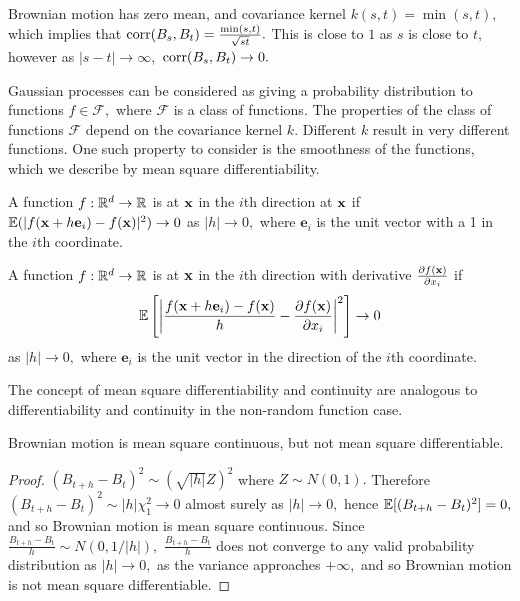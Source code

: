 Brownian motion has zero mean, and covariance kernel $k(s, t) = \min(s, t),$ which
implies that $\operatorname{corr}(B_s, B_t) = \frac{\min(s, t)}{\sqrt{st}}.$ This is close to
$1$ as $s$ is close to $t,$ however as $|s-t|\to\infty,$
$\operatorname{corr}(B_s, B_t) \to 0.$

Gaussian processes can be considered as giving a probability distribution to
functions $f\in\mathcal{F},$ where $\mathcal{F}$ is a class of functions.
The properties of the class of functions
$\mathcal{F}$ depend on the covariance kernel $k.$ Different $k$ result
in very different functions. One such property to consider is the smoothness of
the functions, which we describe by mean square differentiability.

\begin{definition}\label{def:MSC}
    A function $f:\mathbb{R}^d\to\mathbb{R}$ is  at $\mathbf{x}$
    in the $i$th direction at $\mathbf{x}$ if
    $\operatorname{\mathbb{E}}(|f(\mathbf{x} + h\mathbf{e}_i) - f(\mathbf{x})|^2)\to 0$ as $|h|\to 0,$
    where $\mathbf{e}_i$ is the unit vector with a 1 in the $i$th coordinate.
\end{definition}

\begin{definition}
    A function $f:\mathbb{R}^d\to\mathbb{R}$ is  at
    $\mathbf{x}$ in the $i$th direction with derivative
    $\frac{\partial f(\mathbf{x})}{\partial x_i}$ if
    $$
        \operatorname{\mathbb{E}}\left[
            \left|
            \frac{f(\mathbf{x} + h\mathbf{e}_i) - f(\mathbf{x})}{h}
            - \frac{\partial f(\mathbf{x})}{\partial x_i}
            \right|^2
            \right]\to 0
    $$ as $|h|\to 0,$ where $\mathbf{e}_i$ is the unit vector in the direction
    of the $i$th coordinate.
\end{definition}

The concept of mean square differentiability and continuity are analogous to
differentiability and continuity in the non-random function case.

\begin{theorem}
    Brownian motion is mean square continuous, but not mean square
    differentiable.
\end{theorem}
\begin{proof}
    $(B_{t + h} - B_t)^2 \sim (\sqrt{|h|}Z)^2$ where $Z\sim N(0,1).$ Therefore
    $(B_{t + h} - B_t)^2 \sim |h|\chi_1^2 \to 0$ almost surely as $|h|\to 0,$
    hence $\operatorname{\mathbb{E}}[(B_{t + h} - B_t)^2] = 0,$ and so Brownian motion is
    mean square continuous. Since
    $\frac{B_{t + h} - B_t}{h} \sim N(0, 1/|h|),$ $\frac{B_{t + h} - B_t}{h}$
    does not converge to any valid probability distribution as $|h| \to 0,$ as
    the variance approaches $+\infty,$ and so Brownian motion is not
    mean square differentiable.
\end{proof}

